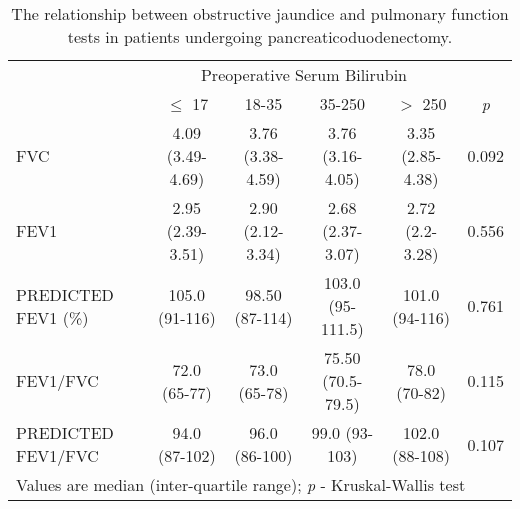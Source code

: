 \begin{sidewaystable}[p]
	\caption{The relationship  between obstructive jaundice and pulmonary function tests in patients undergoing pancreaticoduodenectomy.}
	\label{table:cpet_oj_pft}
	\centering
	\renewcommand{\arraystretch}{1.4} %
	\setlength{\tabcolsep}{9pt} %
	
	\begin{tabular}{|l| c c c c c|}
		\hline
		                    &              \multicolumn{4}{c}{Preoperative Serum Bilirubin}              &  \\
		                    & $\leq$ 17        & 18-35            & 35-250            & $>$ 250          & \textit{p} \\ \hline
		FVC                 & 4.09 (3.49-4.69) & 3.76 (3.38-4.59) & 3.76 (3.16-4.05)  & 3.35 (2.85-4.38) & 0.092      \\
		FEV1                & 2.95 (2.39-3.51) & 2.90 (2.12-3.34) & 2.68 (2.37-3.07)  & 2.72 (2.2-3.28)  & 0.556      \\
		PREDICTED FEV1 (\%) & 105.0 (91-116)   & 98.50 (87-114)   & 103.0 (95-111.5)  & 101.0 (94-116)   & 0.761      \\
		FEV1/FVC            & 72.0 (65-77)     & 73.0 (65-78)     & 75.50 (70.5-79.5) & 78.0 (70-82)     & 0.115      \\
		PREDICTED FEV1/FVC  & 94.0 (87-102)    & 96.0 (86-100)    & 99.0 (93-103)     & 102.0 (88-108)   & 0.107      \\ \hline
		\multicolumn{6}{l}{Values are median (inter-quartile range); \textit{p} - Kruskal-Wallis test}
	\end{tabular}
\end{sidewaystable}



